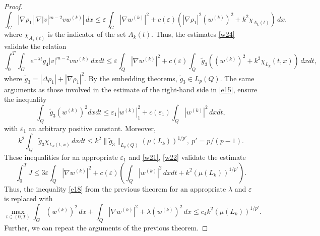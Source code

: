 \documentclass[10pt,a4paper]{amsart}
\begin{document}
\begin{proof}
\begin{equation}\label{w24}
 \int_{G}|\nabla \rho_1| |\nabla |v|^{m-2}v w^{(k)}|\,dx\leq  \varepsilon \int_{G} |\nabla w^{(k)}|^2  + c(\varepsilon) (|\nabla \rho_1|^2 (w^{(k)})^2 + k^2\chi_{A_k(t)})\,dx.
\end{equation}
where $\chi_{A_k(t)}$ is the indicator of the set  $A_k(t)$.
Thus, the estimates   \eqref{w24} validate the relation
$$
\int_0^T \int_Ge^{-\lambda t} g_4 |v|^{m-2} v w^{(k)}\,dxdt \leq \varepsilon \int_{Q}|\nabla w^{(k)}|^2 + c(\varepsilon) \int_Q\tilde{g}_3( (w^{(k)})^2 +k^2\chi_{L_k}(t,x))\,dxdt,
$$
 where  $\tilde{g}_3=|\Delta \rho_1|+|\nabla \rho_1|^2$.
By the embedding theorems,  $\tilde{g}_3\in L_p(Q)$.  
The same arguments as those involved in the estimate of the right-hand side 
in \eqref{e15},  ensure the inequality
 $$
 \int_Q\tilde{g}_3 (w^{(k)})^2dxdt\leq \varepsilon_1 |w^{(k)}|_1^2  + c(\varepsilon_1) \int_Q |w^{(k)}|^2\,dxdt, 
$$
with $\varepsilon_1$ an arbitrary positive constant.
Moreover, 
 $$
 k^2 \int_Q \tilde{g}_3 \chi_{L_k(t,x)} \,dxdt\leq k^2\|\tilde{g}_3\|_{L_p(Q)}(\mu(L_k))^{1/p'},\  p'=p/(p-1). 
$$ 
These inequalities  for an appropriate  $\varepsilon_1$  and \eqref{w21}, \eqref{w22} validate the estimate 
$$
\int_0^T J\leq 3\varepsilon \int_{Q} |\nabla w^{(k)}|^2 + c(\varepsilon)( \int_Q |w^{(k)}|^2\,dxdt + k^2 (\mu(L_k))^{1/p'}).
$$
Thus, the inequality  \eqref{e18} from the previous theorem for an appropriate  $\lambda$ and $\varepsilon$ is replaced with 
 \begin{equation}\label{w25}
\max_{t\in (0,T)} \int_{G} (w^{(k)})^2\,dx +
\int_{Q} |\nabla w^{(k)}|^2+ \lambda  (w^{(k)})^2\,dx \leq  c_4 k^2 (\mu(L_k))^{1/p'}.
\end{equation} 
     Further, we can repeat the arguments of the previous theorem.  
\end{proof} 
\end{document}
